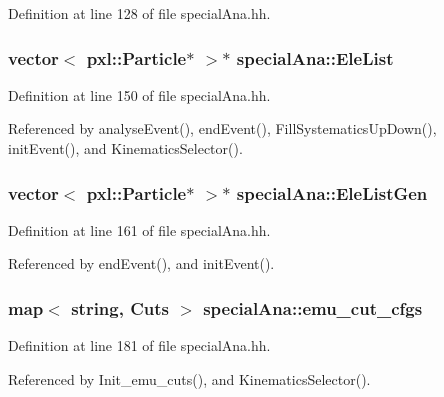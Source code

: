 Definition at line 128 of file special\-Ana.\-hh.

\subsubsection[{Ele\-List}]{\setlength{\rightskip}{0pt plus 5cm}vector$<$ pxl\-::\-Particle$\ast$ $>$$\ast$ special\-Ana\-::\-Ele\-List}\label{classspecialAna_a20428604e5f83134e03ded624a4f4c6a}


Definition at line 150 of file special\-Ana.\-hh.



Referenced by analyse\-Event(), end\-Event(), Fill\-Systematics\-Up\-Down(), init\-Event(), and Kinematics\-Selector().

\subsubsection[{Ele\-List\-Gen}]{\setlength{\rightskip}{0pt plus 5cm}vector$<$ pxl\-::\-Particle$\ast$ $>$$\ast$ special\-Ana\-::\-Ele\-List\-Gen}\label{classspecialAna_a8bfd838b3d91f8a0721b22b75c4078a9}


Definition at line 161 of file special\-Ana.\-hh.



Referenced by end\-Event(), and init\-Event().

\subsubsection[{emu\-\_\-cut\-\_\-cfgs}]{\setlength{\rightskip}{0pt plus 5cm}map$<$ string, {\bf Cuts} $>$ special\-Ana\-::emu\-\_\-cut\-\_\-cfgs}\label{classspecialAna_a15d1b215f95e104a1728a3e090ef76df}


Definition at line 181 of file special\-Ana.\-hh.



Referenced by Init\-\_\-emu\-\_\-cuts(), and Kinematics\-Selector().

